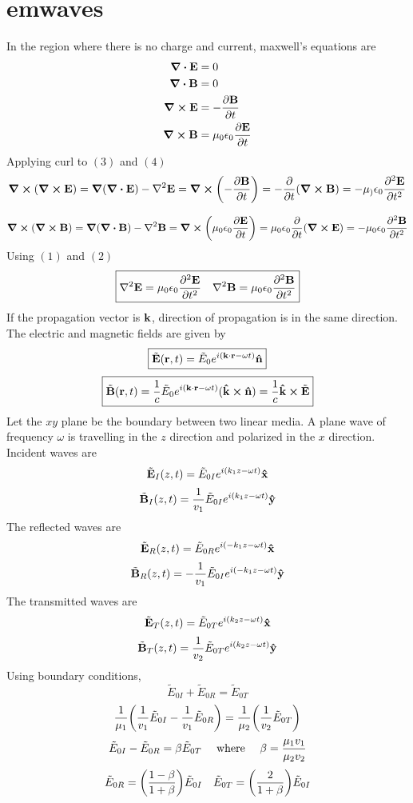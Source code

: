 \section*{emwaves}
In  the region where there is no charge and current, maxwell's equations are 
\begin{align}
\div{\vb{E}}&=0\\
\div{\vb{B}}&=0\\
\curl{\vb{E}}&=-\pdv{\vb{B}}{t}\\
\curl{\vb{B}}&=\mu_0\epsilon_0\pdv{\vb{E}}{t}
\end{align}
Applying curl to $(3)$ and $(4)$ 
\[\curl{\qty(\curl{\vb{E}})}=\grad{\qty(\div{\vb{E}})}-\laplacian{\vb{E}}=\curl{\qty(-\pdv{\vb{B}}{t})}=-\pdv{t}\qty(\curl{\vb{B}})=-\mu_)\epsilon_0\pdv[2]{\vb{E}}{t}\]

\[\curl{\qty(\curl{\vb{B}})}=\grad{\qty(\div{\vb{B}})}-\laplacian{\vb{B}}=\curl{\qty(\mu_0\epsilon_0\pdv{\vb{E}}{t})}=\mu_0\epsilon_0\pdv{t}\qty(\curl{\vb{E}})=-\mu_0\epsilon_0\pdv[2]{\vb{B}}{t}\]
Using $(1)$ and $(2)$ \\
\[\boxed{\laplacian{\vb{E}}=\mu_0\epsilon_0\pdv[2]{\vb{E}}{t}\quad\laplacian{\vb{B}}=\mu_0\epsilon_0\pdv[2]{\vb{B}}{t}}\]
If the propagation vector is $\vb{k}$, direction of propagation is in the same direction.
The electric and magnetic fields are given by
\[\boxed{\tilde{\vb{E}}(\vb{r},t)=\tilde{E}_0e^{i(\vb{k}\cdot\vb{r}-\omega t)}\vu{n}}\]
\[\boxed{\tilde{\vb{B}}(\vb{r},t)=\frac{1}{c}\tilde{E}_0e^{i(\vb{k}\cdot\vb{r}-\omega t)}(\vu{k}\cp\vu{n})=\frac{1}{c}\vu{k}\cp\tilde{\vb{E}}}\]
Let the $xy$ plane be the boundary between two linear media. A plane wave of frequency $\omega$ is travelling in the $z$ direction and polarized in the $x$ direction.\\
Incident waves are \[\tilde{\vb{E}}_I(z,t)=\tilde{E}_{0I}e^{i(k_1z-\omega t)}\vu{x}\]
\[\tilde{\vb{B}}_I(z,t)=\frac{1}{v_1}\tilde{E}_{0I}e^{i(k_1z-\omega t)}\vu{y}\]
The reflected waves are  \[\tilde{\vb{E}}_R(z,t)=\tilde{E}_{0R}e^{i(-k_1z-\omega t)}\vu{x}\]
\[\tilde{\vb{B}}_R(z,t)=-\frac{1}{v_1}\tilde{E}_{0I}e^{i(-k_1z-\omega t)}\vu{y}\]
The transmitted waves are  \[\tilde{\vb{E}}_T(z,t)=\tilde{E}_{0T}e^{i(k_2z-\omega t)}\vu{x}\]
\[\tilde{\vb{B}}_T(z,t)=\frac{1}{v_2}\tilde{E}_{0T}e^{i(k_2z-\omega t)}\vu{y}\]
Using boundary conditions,\\
\[\tilde{E}_{0I}+\tilde{E}_{0R}=\tilde{E}_{0T}\]
\[\frac{1}{\mu_1}\qty(\frac{1}{v_1}\tilde{E}_{0I}-\frac{1}{v_1}\tilde{E}_{0R})=\frac{1}{\mu_2}\qty(\frac{1}{v_2}\tilde{E}_{0T})\]
\[\tilde{E}_{0I}-\tilde{E}_{0R}=\beta\tilde{E}_{0T}\qq{ where }\beta=\frac{\mu_1v_1}{\mu_2v_2}\]
\[\tilde{E}_{0R}=\qty(\frac{1-\beta}{1+\beta})\tilde{E}_{0I}\quad\tilde{E}_{0T}=\qty(\frac{2}{1+\beta})\tilde{E}_{0I}\]
